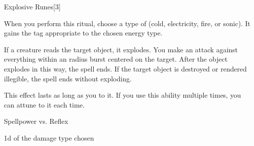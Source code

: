 \begin{spellsection}{Explosive Runes}[3]

\begin{spellcontent}

\begin{spelltargetinginfo}



\end{spelltargetinginfo}


\begin{spelleffects}
\spellspecial
When you perform this ritual, choose a type of  (cold, electricity, fire, or sonic).
It gains the tag appropriate to the chosen energy type.



\spelleffect
If a creature reads the target object, it explodes.
You make an attack against everything within an \areamed radius burst centered on the target.
After the object explodes in this way, the spell ends.
If the target object is destroyed or rendered illegible, the spell ends without exploding.

This effect lasts as long as you  to it.
If you use this ability multiple times, you can attune to it each time.




\begin{spellattack}{Spellpower vs. Reflex}


\spellsuccess {} \minus1d of the damage type chosen


\end{spellattack}





\end{spelleffects}

\end{spellcontent}
\begin{spellfooter}


\end{spellfooter}
\begin{spellsubcontent}


\end{spellsubcontent}
\end{spellsection}


